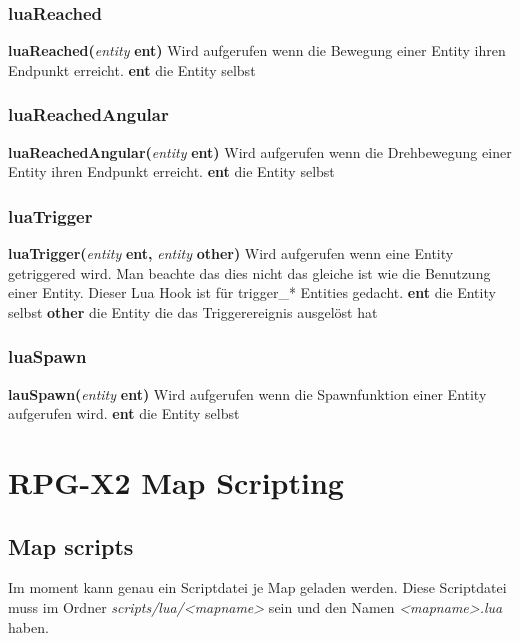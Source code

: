 \documentclass[11pt,a4paper]{book}
\begin{document}
\subsection{luaReached}
\label{luaReached}
\textbf{luaReached(}\textit{entity }\textbf{ent)}
\newline
Wird aufgerufen wenn die Bewegung einer Entity ihren Endpunkt erreicht.
\newline
\textbf{ent} die Entity selbst
\subsection{luaReachedAngular}
\label{luaReachedAngular}
\textbf{luaReachedAngular(}\textit{entity }\textbf{ent)}
\newline
Wird aufgerufen wenn die Drehbewegung einer Entity ihren Endpunkt erreicht.
\newline
\textbf{ent} die Entity selbst
\subsection{luaTrigger}
\label{luaTrigger}
\textbf{luaTrigger(}\textit{entity}\textbf{ ent, }\textit{entity}\textbf{ other)}
\newline
Wird aufgerufen wenn eine Entity getriggered wird. Man beachte das dies nicht das gleiche ist wie die Benutzung einer Entity. Dieser Lua Hook ist für trigger\_* Entities gedacht.
\newline
\textbf{ent} die Entity selbst
\newline
\textbf{other} die Entity die das Triggerereignis ausgelöst hat
\subsection{luaSpawn}
\label{luaSpawn}
\textbf{lauSpawn(}\textit{entity}\textbf{ ent)}
\newline
Wird aufgerufen wenn die Spawnfunktion einer Entity aufgerufen wird.
\newline
\textbf{ent} die Entity selbst
\newpage
\chapter{RPG-X2 Map Scripting}
\label{rpgx2-mapscripting}
\section{Map scripts}
\label{map-scripts}
Im moment kann genau ein Scriptdatei je Map geladen werden. Diese Scriptdatei muss im Ordner \textit{scripts/lua/<mapname>} sein und den Namen \textit{<mapname>.lua} haben.
\end{document}
